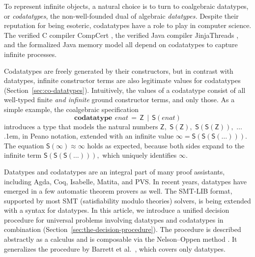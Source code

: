 \documentclass[smallcondensed,draft]{svjour3}
\newcommand\afterLdots{\kern.1em} %
\newcommand\keyw[1]{\textbf{#1}}
\newcommand\const[1]{\textsf{#1}}
\newcommand\ty[1]{\textit{#1}}
\newcommand{\teq}{\approx}
\begin{document}
To represent infinite objects, %
a natural choice is to turn to coalgebraic datatypes, or \emph{codatatypes},
the non-well-founded dual of algebraic \emph{datatypes.}
%
Despite their reputation for being esoteric, codatatypes have a
role to play in computer science. The verified C compiler CompCert
\cite{leroy-2009}, the verified Java compiler Jinja\-Threads
\cite{lochbihler-2010-jinja}, and the formalized Java memory model
\cite{lochbihler-2014-jmm} all depend on codatatypes to capture infinite
processes.

Codatatypes are freely generated by their constructors, but in contrast with datatypes,
infinit\-e constructor terms are also legitimate values for codatatypes
(Section~\ref{sec:co-datatypes}). Intuitively, the
values of a codatatype consist of all well-typed finite \emph{and infinite} ground
constructor
terms, and only those. As a simple example, the coalgebraic specification
%
\[\keyw{codatatype}~\,\ty{enat} \,=\, \const{Z} \,\mid\, \const{S}(\ty{enat})\]
%
introduces a type that
models the natural numbers $\const{Z},$ $\const{S}(\const{Z}),$ $\const{S}(\const{S}(\const{Z})),$ $\ldots$\afterLdots{},
in Peano notation, extended with an
infinite value $\infty = \const{S}(\const{S}(\const{S}(\ldots))).$
The equation $\const{S}(\infty) \teq \infty$ holds as expected,
because both sides expand to the infinite term
$\const{S}(\const{S}(\const{S}(\ldots))),$ which uniquely identifies
$\infty.$

Datatypes and codatatypes are an integral part of many proof assistants,
including Agda, Coq, Isabelle, Matita, and PVS. In recent years, datatypes
have emerged in a few automatic theorem provers as well. The SMT-LIB
\cite{barrett-et-al-2015}
format, supported by most SMT
(satisfiability modulo theories)
solvers, is being extended with a syntax for datatypes.
In this article, we introduce a
unified decision procedure for universal problems involving datatypes and codatatypes
in combination (Section~\ref{sec:the-decision-procedure}).
The procedure is described abstractly as a %
calculus and is composable via the Nelson--Oppen method \cite{nelson-oppen-1979}.
It generalizes the procedure by Barrett et al.\ \cite{barrett-et-al-2007},
which covers only datatypes.
\end{document}
